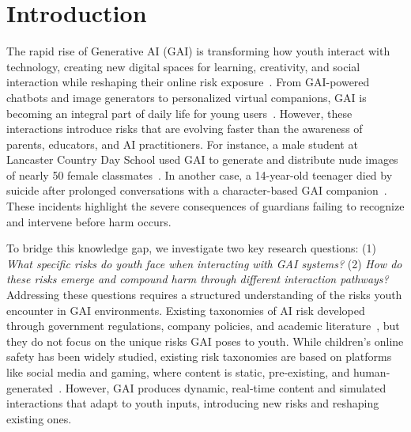 \vspace{-8pt}
\section{Introduction}
The rapid rise of Generative AI (GAI) is transforming how youth interact with technology, creating new digital spaces for learning, creativity, and social interaction while reshaping their online risk exposure~\cite{ofcom2023}. From GAI-powered chatbots and image generators to personalized virtual companions, GAI is becoming an integral part of daily life for young users~\cite{commonSenseMediaGenAI}. However, these interactions introduce risks that are evolving faster than the awareness of parents, educators, and AI practitioners. For instance, a male student at Lancaster Country Day School used GAI to generate and distribute nude images of nearly 50 female classmates~\cite{aiaaicStudentViolates}. In another case, a 14-year-old teenager died by suicide after prolonged conversations with a character-based GAI companion~\cite{aiaaicPaedophileSuicideChatbots}. These incidents highlight the severe consequences of guardians failing to recognize and intervene before harm occurs. 

To bridge this knowledge gap, we investigate two key research questions: (1) \textit{What specific risks do youth face when interacting with GAI systems?} (2) \textit{How do these risks emerge and compound harm through different interaction pathways?} Addressing these questions requires a structured understanding of the risks youth encounter in GAI environments. Existing taxonomies of AI risk developed through government regulations, company policies, and academic literature~\cite{zeng2024ai, slattery2024ai}, but they do not focus on the unique risks GAI poses to youth.  While children’s online safety has been widely studied, existing risk taxonomies are based on platforms like social media and gaming, where content is static, pre-existing, and human-generated~\cite{livingstone2011risks, livingstone2014their}. However, GAI produces dynamic, real-time content and simulated interactions that adapt to youth inputs, introducing new risks and reshaping existing ones. 

